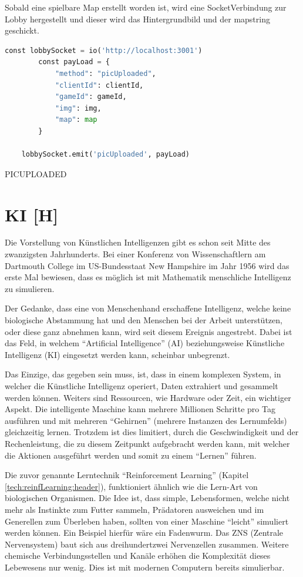 Sobald eine spielbare Map erstellt worden ist, wird eine SocketVerbindung zur Lobby hergestellt und dieser wird das Hintergrundbild und der mapstring geschickt.

\begin{lstlisting}[language=Python,caption=Map wird an Lobby geschickt]
    const lobbySocket = io('http://localhost:3001')
        const payLoad = {
            "method": "picUploaded",
            "clientId": clientId,
            "gameId": gameId,
            "img": img,
            "map": map
        }

    lobbySocket.emit('picUploaded', payLoad)
\end{lstlisting}

PICUPLOADED

\section{KI [H]}\label{maai:ai:title}
Die Vorstellung von Künstlichen Intelligenzen gibt es schon seit Mitte des zwanzigsten Jahrhunderts. Bei einer Konferenz von Wissenschaftlern am Dartmouth College im US-Bundesstaat New Hampshire im Jahr 1956 wird das erste Mal bewiesen, dass es möglich ist mit Mathematik menschliche Intelligenz zu simulieren.

Der Gedanke, dass eine von Menschenhand erschaffene Intelligenz, welche keine biologische Abstammung hat und den Menschen bei der Arbeit unterstützen, oder diese ganz abnehmen kann, wird seit diesem Ereignis angestrebt. Dabei ist das Feld, in welchem ``Artificial Intelligence'' (AI) beziehungsweise Künstliche Intelligenz (KI) eingesetzt werden kann, scheinbar unbegrenzt.

Das Einzige, das gegeben sein muss, ist, dass in einem komplexen System, in welcher die Künstliche Intelligenz operiert, Daten extrahiert und gesammelt werden können. Weiters sind Ressourcen, wie Hardware oder Zeit, ein wichtiger Aspekt. Die intelligente Maschine kann mehrere Millionen Schritte pro Tag ausführen und mit mehreren ``Gehirnen'' (mehrere Instanzen des Lernumfelds) gleichzeitig lernen. Trotzdem ist dies limitiert, durch die Geschwindigkeit und der Rechenleistung, die zu diesem Zeitpunkt aufgebracht werden kann, mit welcher die Aktionen ausgeführt werden und somit zu einem ``Lernen'' führen.

Die zuvor genannte Lerntechnik ``Reinforcement Learning'' (Kapitel \ref{tech:reinfLearning:header}), funktioniert ähnlich wie die Lern-Art von biologischen Organismen. Die Idee ist, dass simple, Lebensformen, welche nicht mehr als Instinkte zum Futter sammeln, Prädatoren ausweichen und im Generellen zum Überleben haben, sollten von einer Maschine ``leicht'' simuliert werden können. Ein Beispiel hierfür wäre ein Fadenwurm. Das ZNS (Zentrale Nervensystem) baut sich aus dreihundertzwei Nervenzellen zusammen. Weitere chemische Verbindungsstellen und Kanäle erhöhen die Komplexität dieses Lebewesens nur wenig. Dies ist mit modernen Computern bereits simulierbar.

